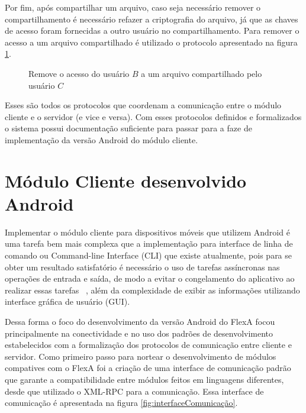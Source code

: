        Por fim, após compartilhar um arquivo, caso seja necessário remover o compartilhamento é necessário refazer a criptografia do arquivo, já que as chaves de acesso foram fornecidas a outro usuário no compartilhamento. Para remover o acesso a um arquivo compartilhado é utilizado o protocolo apresentado na figura \ref{fig:protRemoveShare}.
        
        \begin{figure}[!ht]
        \caption{Remove o acesso do usuário $B$ a um arquivo compartilhado pelo usuário $C$}
        \label{fig:protRemoveShare}
        \end{figure}
        
        
        Esses são todos os protocolos que coordenam a comunicação entre o módulo cliente e o servidor (e vice e versa). Com esses protocolos definidos e formalizados o sistema possui documentação suficiente para passar para a faze de implementação da versão Android do módulo cliente.
        
        
        \section{Módulo Cliente desenvolvido Android}
        
        
        Implementar o módulo cliente para dispositivos móveis que utilizem Android é uma tarefa bem mais complexa que a implementação para interface de linha de comando ou Command-line Interface (CLI) que existe atualmente, pois para se obter um resultado satisfatório é necessário o uso de tarefas assíncronas nas operações de entrada e saída, de modo a evitar o congelamento do aplicativo ao realizar essas tarefas ~\cite{androidAssyncTask}, além da complexidade de exibir as informações utilizando interface gráfica de usuário (GUI).
        
        Dessa forma o foco do desenvolvimento da versão Android do FlexA focou principalmente na conectividade e no uso dos padrões de desenvolvimento estabelecidos com a formalização dos protocolos de comunicação entre cliente e servidor. Como primeiro passo para nortear o desenvolvimento de módulos compatives com o FlexA foi a criação de uma interface de comunicação padrão que garante a compatibilidade entre módulos feitos em linguagens diferentes, desde que utilizado o XML-RPC para a comunicação. Essa interface de comunicação é apresentada na figura \ref{fig:interfaceComunicação}.
        
